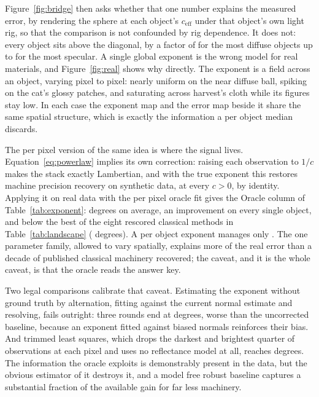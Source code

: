 \documentclass[10pt,twocolumn,letterpaper]{article}
\begin{document}
Figure~\ref{fig:bridge} then asks whether that one number explains the
measured error, by rendering the sphere at each object's $c_{\mathrm{eff}}$
under that object's own light rig, so that the comparison is not confounded by
rig dependence. It does not: every object sits above the diagonal, by a factor
of \bridgeRatioMin{} for the most diffuse objects up to \bridgeRatioMax{} for
the most specular. A single global exponent is the wrong model for real
materials, and Figure~\ref{fig:real} shows why directly. The exponent is a
field across an object, varying pixel to pixel: nearly uniform on the near
diffuse ball, spiking on the cat's glossy patches, and saturating across
harvest's cloth while its figures stay low. In each case the exponent map and
the error map beside it share the same spatial structure, which is exactly the
information a per object median discards.

The per pixel version of the same idea is where the signal lives.
Equation~\eqref{eq:powerlaw} implies its own correction: raising each
observation to $1/c$ makes the stack exactly Lambertian, and with the true
exponent this restores machine precision recovery on synthetic data, at every
$c > 0$, by identity. Applying it on real data with the per pixel oracle fit
gives the Oracle column of Table~\ref{tab:exponent}: \oraclePixAvg{} degrees
on average, an improvement on every single object, and below the best of the
eight rescored classical methods in Table~\ref{tab:landscape}
(\landscapeBest{} degrees). A per object exponent manages only
\oracleObjAvg{}. The one parameter family, allowed to vary spatially, explains
more of the real error than a decade of published classical machinery
recovered; the caveat, and it is the whole caveat, is that the oracle reads
the answer key.

Two legal comparisons calibrate that caveat. Estimating the exponent without
ground truth by alternation, fitting against the current normal estimate and
resolving, fails outright: three rounds end at \naiveAvg{} degrees, worse than
the uncorrected baseline, because an exponent fitted against biased normals
reinforces their bias. And trimmed least squares, which drops the darkest and
brightest quarter of observations at each pixel and uses no reflectance model
at all, reaches \trimAvg{} degrees. The information the oracle exploits is
demonstrably present in the data, but the obvious estimator of it destroys
it, and a model free robust baseline captures a substantial fraction of the
available gain for far less machinery.
\end{document}

